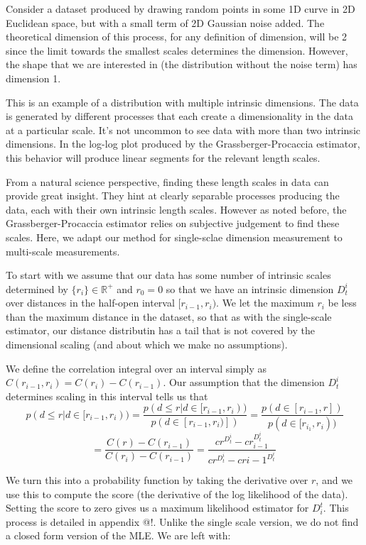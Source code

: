 \documentclass[11pt]{article}
\begin{document}
Consider a dataset produced by drawing random points in some 1D curve in 2D Euclidean space, but with a small term of 2D Gaussian noise added. The theoretical dimension of this process, for any definition of dimension, will be 2 since the limit towards the smallest scales determines the dimension. However, the shape that we are interested in (the distribution without the noise term) has dimension 1. 

This is an example of a distribution with multiple intrinsic dimensions. The data is generated by different processes that each create a dimensionality in the data at a particular scale. It's not uncommon to see data with more than two intrinsic dimensions. In the log-log plot produced by the Grassberger-Procaccia estimator, this behavior will produce linear segments for the relevant length scales.

From a natural science perspective, finding these length scales in data can provide great insight. They hint at clearly separable processes producing the data, each with their own intrinsic length scales. However as noted before, the Grassberger-Procaccia estimator relies on subjective judgement to find these scales. Here, we adapt our method for single-sclae dimension measurement to multi-scale measurements.

To start with we assume that our data has some number of intrinsic scales determined by $\{r_i\} \in {\mathbb R}^+$ and $r_0 = 0$ so that we have an intrinsic dimension $D_t^i$ over distances in the half-open interval $[r_{i-1}, r_{i})$. We let the maximum $r_i$ be less than the maximum distance in the dataset, so that as with the single-scale estimator, our distance distributin has a tail that is not covered by the dimensional scaling (and about which we make no assumptions).

We define the correlation integral over an interval simply as $C(r_{i-1}, r_i) = C(r_i) - C(r_{i-1})$. Our assumption that the dimension $D_t^i$ determines scaling in this interval tells us that 
\[
p(d \leq r | d \in [r_{i-1}, r_i)) = \frac{p(d \leq r | d \in [r_{i-1}, r_i))}{p(d \in [r_{i-1}, r_i)])} = \frac{p(d \in [r_{i-1}, r])}{p(d \in [r_{i_1}, r_i))}
\]
\[
 = \frac{C(r) - C(r_{i-1})}{C(r_i) - C(r_{i-1})} = \frac{cr^{D^i_t} - cr_{i-1}^{D^i_t}}{cr^{D^i_t} - cr{i-1}^{D^i_t}}\
\]

We turn this into a probability function by taking the derivative over $r$, and we use this to compute the score (the derivative of the log likelihood of the data). Setting the score to zero gives us a maximum likelihood estimator for $D^t_i$. This process is detailed in appendix @!. Unlike the single scale version, we do not find a closed form version of the MLE. We are left with:
\end{document}
